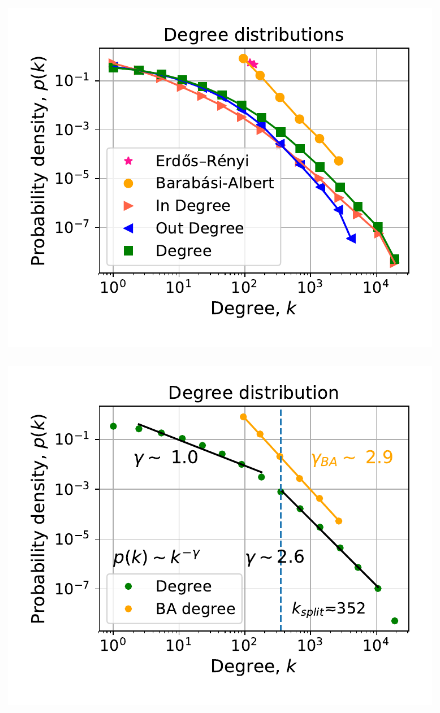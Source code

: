 \documentclass[12pt, twoside]{report}
\begin{document}
\begin{minipage}[b]{0.5\textwidth}
   \centering
    \begin{figure}[H]
      \includegraphics[width=\textwidth]{../../scripts/network_analysis/imgs/degree_distributions.pdf}            
          \caption{}
        \label{fig:in_degree}
\end{figure}
\end{minipage}
\begin{minipage}[b]{0.5\textwidth}
  \begin{figure}[H]
  \centering
  \includegraphics[width=\textwidth]{../../scripts/network_analysis/imgs/tot_degree_distribution.pdf}            
        \caption{}
\label{fig:out_degree}
\end{figure}
\end{minipage}
    
\end{document}
